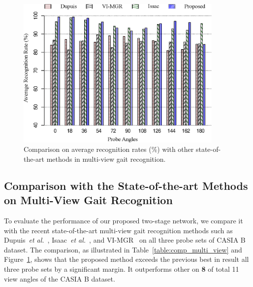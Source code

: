 \begin{figure}
	\centering
	\includegraphics[width= 0.9\textwidth]{figures/comp_casia_b_multi_view.eps}
	\caption [Comparison on average recognition rates (\%) with other state-of-the-art methods in multi-view gait recognition]{
		Comparison on average recognition rates (\%) with other state-of-the-art methods in multi-view gait recognition.  \label{fig:comp_casia_b_multi_view}
	}
\end{figure}



\subsection{Comparison with the State-of-the-art Methods on Multi-View Gait Recognition}
To evaluate the performance of our proposed two-stage network, we compare it with the recent state-of-the-art multi-view gait recognition methods such as Dupuis~\textit{et al.}~\cite{Dupuis_13}, Isaac~\textit{et al.}~\cite{Isaac_17}, and VI-MGR~\cite{Choudhury_15} on all three probe sets of CASIA B dataset. The comparison, as illustrated in Table~\ref{table:comp_multi_view} and Figure~\ref{fig:comp_casia_b_multi_view}, shows that the proposed method exceeds the previous best in result all three probe sets by a significant margin. It outperforms other on \textbf{8 } of total 11 view angles of the CASIA B dataset. 



